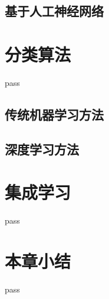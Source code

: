\subsection{基于人工神经网络}



\section{分类算法}

pass

\subsection{传统机器学习方法}


\subsection{深度学习方法}


\section{集成学习}

pass






\section{本章小结}

pass
